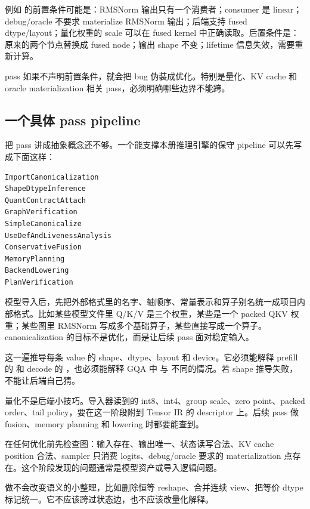 例如  的前置条件可能是：RMSNorm 输出只有一个消费者；consumer 是 linear；debug/oracle 不要求 materialize RMSNorm 输出；后端支持 fused dtype/layout；量化权重的 scale 可以在 fused kernel 中正确读取。后置条件是：原来的两个节点替换成 fused node；输出 shape 不变；lifetime 信息失效，需要重新计算。

\begin{warningbox}
pass 如果不声明前置条件，就会把 bug 伪装成优化。特别是量化、KV cache 和 oracle materialization 相关 pass，必须明确哪些边界不能跨。
\end{warningbox}

\subsection{一个具体 pass pipeline}

把 pass 讲成抽象概念还不够。一个能支撑本册推理引擎的保守 pipeline 可以先写成下面这样：

\begin{lstlisting}[numbers=none,caption={第三册项目的保守 pass pipeline}]
ImportCanonicalization
ShapeDtypeInference
QuantContractAttach
GraphVerification
SimpleCanonicalize
UseDefAndLivenessAnalysis
ConservativeFusion
MemoryPlanning
BackendLowering
PlanVerification
\end{lstlisting}

 模型导入后，先把外部格式里的名字、轴顺序、常量表示和算子别名统一成项目内部格式。比如某些模型文件里 Q/K/V 是三个权重，某些是一个 packed QKV 权重；某些图里 RMSNorm 写成多个基础算子，某些直接写成一个算子。canonicalization 的目标不是优化，而是让后续 pass 面对稳定输入。

 这一遍推导每条 value 的 shape、dtype、layout 和 device。它必须能解释 prefill 的 \code{[T,H]} 和 decode 的 \code{[1,H]}，也必须能解释 GQA 中  与  不同的情况。若 shape 推导失败，不能让后端自己猜。

 量化不是后端小技巧。导入器读到的 int8、int4、group scale、zero point、packed order、tail policy，要在这一阶段附到 Tensor IR 的 descriptor 上。后续 pass 做 fusion、memory planning 和 lowering 时都要能查到。

 在任何优化前先检查图：输入存在、输出唯一、状态读写合法、KV cache position 合法、sampler 只消费 logits、debug/oracle 要求的 materialization 点存在。这个阶段发现的问题通常是模型资产或导入逻辑问题。

 做不会改变语义的小整理，比如删除恒等 reshape、合并连续 view、把等价 dtype 标记统一。它不应该跨过状态边，也不应该改量化解释。


